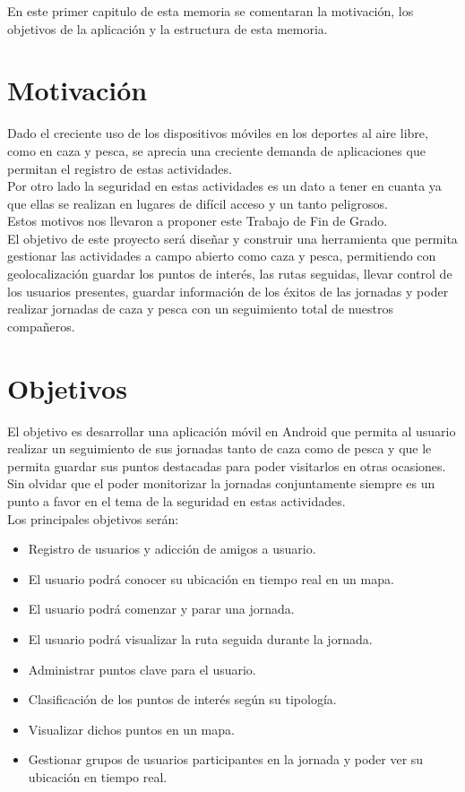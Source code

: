 En este primer capitulo de esta memoria se comentaran la motivación, los objetivos de la aplicación y la estructura de esta memoria. 




\section{Motivación}
Dado el creciente uso de los dispositivos móviles en los deportes al aire libre, como en caza y pesca, se aprecia una creciente demanda de aplicaciones que permitan el registro de estas actividades.\\
Por otro lado la seguridad en estas actividades es un dato a tener en cuanta ya que ellas se realizan en lugares de difícil acceso y un tanto peligrosos.\\

Estos motivos nos llevaron a proponer este Trabajo de Fin de Grado.\\

El objetivo de este proyecto será diseñar y construir una herramienta que permita gestionar las actividades a campo abierto como
caza y pesca, permitiendo con geolocalización guardar los puntos de interés, las rutas seguidas,
llevar control de los usuarios presentes, guardar información de los éxitos de las jornadas y poder realizar jornadas de caza y pesca con un seguimiento  total de nuestros compañeros.






 

\section{Objetivos}
El objetivo es desarrollar una aplicación móvil en Android que permita al usuario realizar un seguimiento de sus jornadas tanto de caza como de pesca  y que le permita guardar sus puntos destacadas para poder visitarlos en otras ocasiones. Sin olvidar que el poder monitorizar la jornadas conjuntamente siempre es un punto a favor en el tema de la seguridad en estas actividades.\\ Los principales objetivos serán:

\begin{itemize}
\item Registro de usuarios y adicción de amigos a usuario.
\item El usuario podrá conocer su ubicación en tiempo real en un mapa.
\item El usuario podrá comenzar y parar una jornada.
\item El usuario podrá visualizar la ruta seguida durante la jornada.
\item Administrar puntos clave para el usuario.
\item Clasificación de los puntos de interés según su tipología.
\item Visualizar dichos puntos en un mapa.
\item Gestionar grupos de usuarios participantes en la jornada y poder ver su ubicación en tiempo
real.

\end{itemize}


